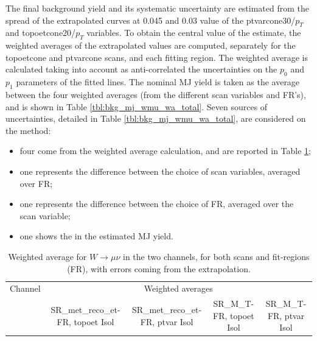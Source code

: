 The final background yield and its systematic uncertainty are estimated from the spread of the extrapolated curves at 0.045 and 0.03 value of the ptvarcone30/$p_T$ and topoetcone20/$p_T$ variables.
To obtain the central value of the estimate, the weighted averages of the extrapolated values are computed, separately for the topoetcone and ptvarcone scans, and each fitting region.
The weighted average is calculated taking into account as anti-correlated the uncertainties on the $p_0$ and $p_1$ parameters of the fitted lines.
The nominal MJ yield is taken as the average between the four weighted averages (from the different scan variables and FR’s), and is shown in Table \ref{tbl:bkg_mj_wmu_wa_total}.
Seven sources of uncertainties, detailed in Table \ref{tbl:bkg_mj_wmu_wa_total}, are considered on the method:
\begin{itemize}
\item four come from the weighted average calculation, and are reported in Table \ref{tbl:bkg_mj_wmu_wa_extrapolation};
\item one represents the difference between the choice of scan variables, averaged over FR;
\item one represents the difference between the choice of FR, averaged over the scan variable;
\item one shows the  in the estimated MJ yield.
\end{itemize}

\begin{table}[htbp]
\scriptsize
\begin{center}
 \begin{tabular}{ | c | c | c | c | c | } 
 \hline
Channel & \multicolumn{4}{|c|}{Weighted averages} \\
  & SR\_met\_reco\_et-FR, topoet Isol & SR\_met\_reco\_et-FR, ptvar Isol & SR\_M\_T-FR, topoet Isol & SR\_M\_T-FR, ptvar Isol \\
\hline
 
  \hline
\end{tabular}
\caption{
Weighted average for $W\rightarrow \mu\nu$ in the two channels, for both scans and fit-regions (FR), with errors coming from the extrapolation.
}%
\label{tbl:bkg_mj_wmu_wa_extrapolation}
\end{center}
\end{table}

